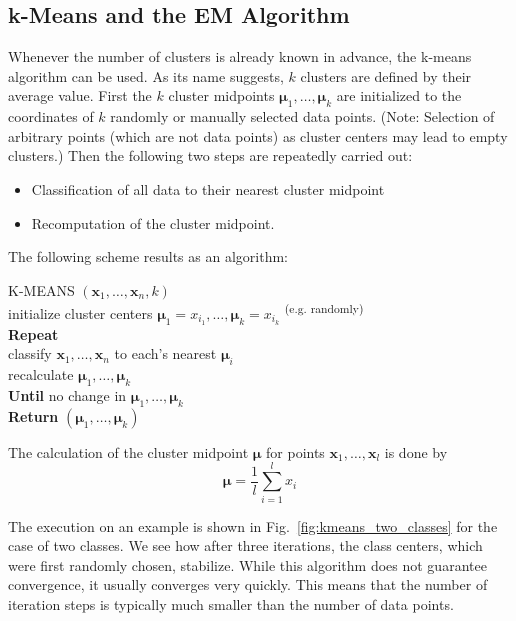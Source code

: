 \documentclass[10pt]{book}
\begin{document}
\subsection{k-Means and the EM Algorithm}
Whenever the number of clusters is already known in advance, the k-means algorithm can be used. As its name suggests, $k$ clusters are defined by their average value. First the $k$ cluster midpoints $\boldsymbol{\mu}_{1}, \ldots, \boldsymbol{\mu}_{k}$ are initialized to the coordinates of $k$ randomly or manually selected data points. (Note: Selection of arbitrary points (which are not data points) as cluster centers may lead to empty clusters.) Then the following two steps are repeatedly carried out:
\begin{itemize}
  \item Classification of all data to their nearest cluster midpoint
  \item Recomputation of the cluster midpoint.
\end{itemize}

The following scheme results as an algorithm:

\noindent K-MEANS $\left(\boldsymbol{x}_{1}, \ldots, \boldsymbol{x}_{n}, k\right)$\\
initialize cluster centers $\boldsymbol{\mu}_{1}=x_{i_{1}}, \ldots, \boldsymbol{\mu}_{k}=x_{i_{k}}$ \textsuperscript{(e.g. randomly)}\\
\textbf{Repeat}\\
\quad classify $\boldsymbol{x}_{1}, \ldots, \boldsymbol{x}_{n}$ to each's nearest $\boldsymbol{\mu}_{i}$\\
\quad recalculate $\boldsymbol{\mu}_{1}, \ldots, \boldsymbol{\mu}_{k}$\\
\textbf{Until} no change in $\boldsymbol{\mu}_{1}, \ldots, \boldsymbol{\mu}_{k}$\\
\textbf{Return} $\left(\boldsymbol{\mu}_{1}, \ldots, \boldsymbol{\mu}_{k}\right)$

The calculation of the cluster midpoint $\boldsymbol{\mu}$ for points $\boldsymbol{x}_{1}, \ldots, \boldsymbol{x}_{l}$ is done by
\[
\boldsymbol{\mu}=\frac{1}{l} \sum_{i=1}^{l} x_{i}
\]

The execution on an example is shown in Fig.~\ref{fig:kmeans_two_classes} for the case of two classes. We see how after three iterations, the class centers, which were first randomly chosen, stabilize. While this algorithm does not guarantee convergence, it usually converges very quickly. This means that the number of iteration steps is typically much smaller than the number of data points.
\end{document}
